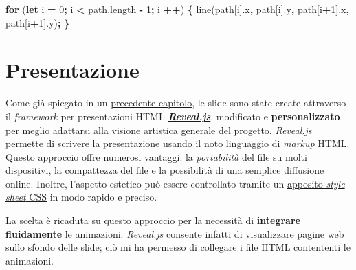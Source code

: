 \documentclass[
]{book}
\newenvironment{Shaded}{\begin{snugshade}}{\end{snugshade}}
\newcommand{\AttributeTok}[1]{\textcolor[rgb]{0.77,0.63,0.00}{#1}}
\newcommand{\ControlFlowTok}[1]{\textcolor[rgb]{0.13,0.29,0.53}{\textbf{#1}}}
\newcommand{\DecValTok}[1]{\textcolor[rgb]{0.00,0.00,0.81}{#1}}
\newcommand{\KeywordTok}[1]{\textcolor[rgb]{0.13,0.29,0.53}{\textbf{#1}}}
\newcommand{\NormalTok}[1]{#1}
\newcommand{\OperatorTok}[1]{\textcolor[rgb]{0.81,0.36,0.00}{\textbf{#1}}}
\newcommand{\VariableTok}[1]{\textcolor[rgb]{0.00,0.00,0.00}{#1}}
\begin{document}
\begin{Shaded}
\begin{Highlighting}[]
\ControlFlowTok{for}\NormalTok{ (}\KeywordTok{let}\NormalTok{ i }\OperatorTok{=} \DecValTok{0}\OperatorTok{;}\NormalTok{ i }\OperatorTok{<} \VariableTok{path}\NormalTok{.}\AttributeTok{length} \OperatorTok{-} \DecValTok{1}\OperatorTok{;}\NormalTok{ i }\OperatorTok{++}\NormalTok{) }\OperatorTok{\{}
  \AttributeTok{line}\NormalTok{(path[i].}\AttributeTok{x}\OperatorTok{,}\NormalTok{ path[i].}\AttributeTok{y}\OperatorTok{,}\NormalTok{ path[i}\OperatorTok{+}\DecValTok{1}\NormalTok{].}\AttributeTok{x}\OperatorTok{,}\NormalTok{ path[i}\OperatorTok{+}\DecValTok{1}\NormalTok{].}\AttributeTok{y}\NormalTok{)}\OperatorTok{;}
\OperatorTok{\}}
\end{Highlighting}
\end{Shaded}

\hypertarget{pressoft}{%
\section{Presentazione}\label{pressoft}}

Come già spiegato in un \protect\hyperlink{presentzione}{precedente capitolo}, le slide sono state create attraverso il \emph{framework} per presentazioni HTML \href{https://revealjs.com/}{\emph{\textbf{Reveal.js}}}, modificato e \textbf{personalizzato} per meglio adattarsi alla \protect\hyperlink{filosofia}{visione artistica} generale del progetto. \emph{Reveal.js} permette di scrivere la presentazione usando il noto linguaggio di \emph{markup} HTML. Questo approccio offre numerosi vantaggi: la \emph{portabilità} del file su molti dispositivi, la compattezza del file e la possibilità di una semplice diffusione online.
Inoltre, l'aspetto estetico può essere controllato tramite un \href{https://github.com/Bradwave/thesis/blob/master/dist/theme/math.css}{apposito \emph{style sheet} CSS} in modo rapido e preciso.

La scelta è ricaduta su questo approccio per la necessità di \textbf{integrare fluidamente} le animazioni. \emph{Reveal.js} consente infatti di visualizzare pagine web sullo sfondo delle slide; ciò mi ha permesso di collegare i file HTML contententi le animazioni.
\end{document}
